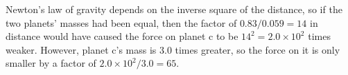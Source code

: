 Newton's law of gravity depends on the inverse square of
the distance, so if the two planets' masses had been equal,
then the factor of $0.83/0.059=14$ in distance would have
caused the force on planet c to be $14^2=2.0\times10^2$
times weaker. However, planet c's mass is 3.0 times greater,
so the force on it is only smaller by a factor of $2.0\times10^2 /3.0=65$.



